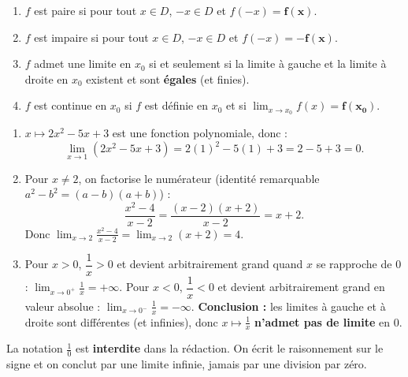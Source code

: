 \documentclass[11pt]{article}
\begin{document}
\begin{corrige}
\begin{enumerate}
\item $f$ est paire si pour tout $x\in D$, $-x\in D$ et $f(-x)=\mathbf{f(x)}$.
\item $f$ est impaire si pour tout $x\in D$, $-x\in D$ et $f(-x)=\mathbf{-f(x)}$.
\item $f$ admet une limite en $x_0$ si et seulement si la limite à gauche et la limite à droite en $x_0$ existent et sont \textbf{égales} (et finies).
\item $f$ est continue en $x_0$ si $f$ est définie en $x_0$ et si $\displaystyle\lim_{x\to x_0}f(x)=\mathbf{f(x_0)}$.
\end{enumerate}
\end{corrige}

\begin{corrige}
\begin{enumerate}
\item $x\mapsto 2x^2-5x+3$ est une fonction polynomiale, donc :
\[ \lim_{x\to 1}(2x^2-5x+3)=2(1)^2-5(1)+3=2-5+3=0. \]
\item Pour $x\neq 2$, on factorise le numérateur (identité remarquable $a^2-b^2=(a-b)(a+b)$) :
\[ \frac{x^2-4}{x-2}=\frac{(x-2)(x+2)}{x-2}=x+2. \]
Donc $\displaystyle\lim_{x\to 2}\frac{x^2-4}{x-2}=\lim_{x\to 2}(x+2)=4$.
\item Pour $x>0$, $\dfrac{1}{x}>0$ et devient arbitrairement grand quand $x$ se rapproche de $0$ : $\displaystyle\lim_{x\to 0^+}\frac{1}{x}=+\infty$.
Pour $x<0$, $\dfrac{1}{x}<0$ et devient arbitrairement grand en valeur absolue : $\displaystyle\lim_{x\to 0^-}\frac{1}{x}=-\infty$.
\textbf{Conclusion :} les limites à gauche et à droite sont différentes (et infinies), donc $x\mapsto\frac1x$ \textbf{n'admet pas de limite} en $0$.
\end{enumerate}
\end{corrige}

\begin{attention}
La notation $\frac{1}{0}$ est \textbf{interdite} dans la rédaction. On écrit le raisonnement sur le signe et on conclut par une limite infinie, jamais par une division par zéro.
\end{attention}
\end{document}
